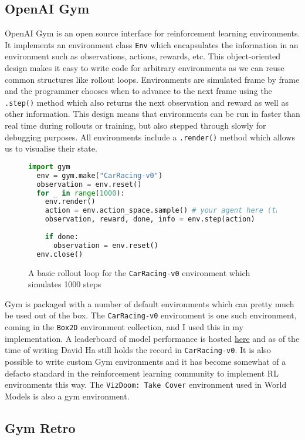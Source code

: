 \documentclass{article}
\numberwithin{figure}{section}
\theoremstyle{definition}
\begin{document}
\subsection{OpenAI Gym}
OpenAI Gym is an open source interface for reinforcement learning environments.
It implements an environment class \texttt{Env} which encapsulates the information in an environment such as observations, actions, rewards, etc.
This object-oriented design makes it easy to write code for arbitrary environments as we can reuse common structures like rollout loops.
Environments are simulated frame by frame and the programmer chooses when to advance to the next frame using the \texttt{.step()} method which also returns the next observation and reward as well as other information.
This design means that environments can be run in faster than real time during rollouts or training, but also stepped through slowly for debugging purposes.
All environments include a \texttt{.render()} method which allows us to visualise their state.

\lstset{style=pystyle}
\begin{figure}[h]
\begin{lstlisting}[language=Python]
  import gym
  env = gym.make("CarRacing-v0")
  observation = env.reset()
  for _ in range(1000):
    env.render()
    action = env.action_space.sample() # your agent here (this takes random actions)
    observation, reward, done, info = env.step(action)
  
    if done:
      observation = env.reset()
  env.close()
\end{lstlisting}
\caption{A basic rollout loop for the \texttt{CarRacing-v0} environment which simulates 1000 steps}
\end{figure}

Gym is packaged with a number of default environments which can pretty much be used out of the box.
The \texttt{CarRacing-v0} environment is one such environment, coming in the \texttt{Box2D} environment collection, and I used this in my implementation.
A leaderboard of model performance is hosted \href{https://github.com/openai/gym/wiki/Leaderboard}{here} and as of the time of writing David Ha still holds the record in \texttt{CarRacing-v0}.
It is also possible to write custom Gym environments and it has become somewhat of a defacto standard in the reinforcement learning community to implement RL environments this way.
The \texttt{VizDoom: Take Cover} environment used in World Models is also a gym environment.

\subsection{Gym Retro}
\end{document}
